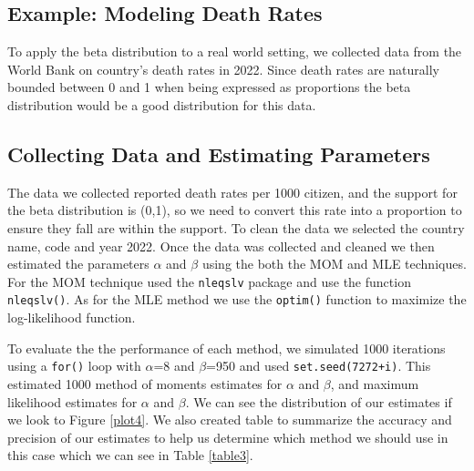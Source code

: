 \documentclass{article}\usepackage[]{graphicx}\usepackage[]{xcolor}
\begin{document}
\begin{multicols}{2}
\section{Example: Modeling Death Rates}
To apply the beta distribution to a real world setting, we collected data from the World Bank on country's death rates in 2022. Since death rates are naturally bounded between 0 and 1 when being expressed as proportions the beta distribution would be a good distribution for this data.  

\subsection{Collecting Data and Estimating Parameters}
The data we collected reported death rates per 1000 citizen, and the support for the beta distribution is (0,1), so we need to convert this rate into a proportion to ensure they fall are within the support. To clean the data we selected the country name, code and year 2022. Once the data was collected and cleaned we then estimated the parameters $\alpha$ and $\beta$ using the both the MOM and MLE techniques. For the MOM technique used the \texttt{nleqslv} package \citep{nleqslv} and use the function \verb|nleqslv()|. As for the MLE method we use the \verb|optim()| function to maximize the log-likelihood function. 

To evaluate the the performance of each method, we simulated 1000 iterations using a \verb|for()| loop with $\alpha$=8 and $\beta$=950 and used \texttt{set.seed(7272+i)}. This estimated 1000 method of moments estimates for $\alpha$ and $\beta$, and maximum likelihood estimates for $\alpha$ and $\beta$. We can see the distribution of our estimates if we look to Figure \ref{plot4}. We also created table to summarize the accuracy and precision of our estimates to help us determine which method we should use in this case which we can see in Table \ref{table3}.


\end{multicols}
\end{document}
